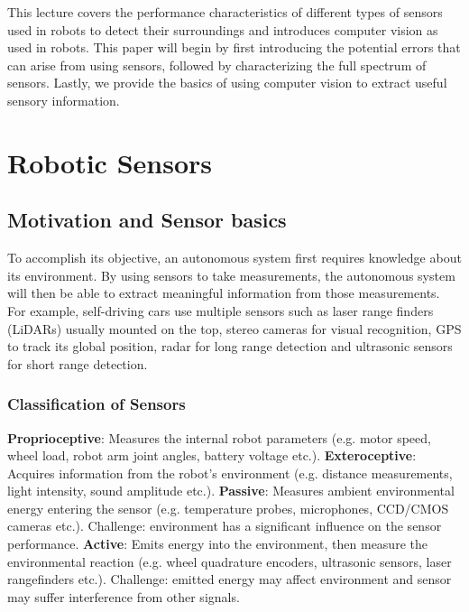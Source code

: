 This lecture covers the performance characteristics of different types of sensors used in robots to detect their surroundings and introduces computer vision as used in robots. This paper will begin by first introducing the potential errors that can arise from using sensors, followed by characterizing the full spectrum of sensors. Lastly, we provide the basics of using computer vision to extract useful sensory information.

\section{Robotic Sensors}

\subsection{Motivation and Sensor basics}
To accomplish its objective, an autonomous system first requires knowledge about its environment. By using sensors to take measurements, the autonomous system will then be able to extract meaningful information from those measurements. For example, self-driving cars use multiple sensors such as laser range finders (LiDARs) usually mounted on the top, stereo cameras for visual recognition, GPS to track its global position, radar for long range detection and ultrasonic sensors for short range detection.
\subsubsection{Classification of Sensors}

\textbf{Proprioceptive}: Measures the internal robot parameters (e.g. motor speed, wheel load, robot arm joint angles, battery voltage etc.). \newline \newline
\textbf{Exteroceptive}: Acquires information from the robot's environment (e.g. distance measurements, light intensity, sound amplitude etc.). \newline \newline
\textbf{Passive}: Measures ambient environmental energy entering the sensor (e.g. temperature probes, microphones, CCD/CMOS cameras etc.). Challenge: environment has a significant influence on the sensor performance.\newline \newline
\textbf{Active}: Emits energy into the environment, then measure the environmental reaction (e.g. wheel quadrature encoders, ultrasonic sensors, laser rangefinders etc.). Challenge: emitted energy may affect environment and sensor may suffer interference from other signals. 


